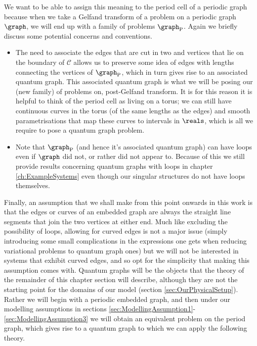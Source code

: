 We want to be able to assign this meaning to the period cell of a periodic graph because when we take a Gelfand transform of a problem on a periodic graph $\graph$, we will end up with a family of problems $\graph_{\mathrm{P}}$.
Again we briefly discuss some potential concerns and conventions.
\begin{itemize}
	\item The need to associate the edges that are cut in two and vertices that lie on the boundary of $\mathcal{C}$ allows us to preserve some idea of edges with lengths connecting the vertices of $\graph_{\mathrm{P}}$, which in turn gives rise to an associated quantum graph.
	This associated quantum graph is what we will be posing our (new family) of problems on, post-Gelfand transform.
	It is for this reason it is helpful to think of the period cell as living on a torus; we can still have continuous curves in the torus (of the same lengths as the edges) and smooth parametrisations that map these curves to intervals in $\reals$, which is all we require to pose a quantum graph problem.
	\item Note that $\graph_{\mathrm{P}}$ (and hence it's associated quantum graph) can have loops even if $\graph$ did not, or rather did not appear to.
	Because of this we still provide results concerning quantum graphs with loops in chapter \ref{ch:ExampleSystems} even though our singular structures do not have loops themselves.
\end{itemize}
Finally, an assumption that we shall make from this point onwards in this work is that the edges or curves of an embedded graph are always the straight line segments that join the two vertices at either end.
Much like excluding the possibility of loops, allowing for curved edges is not a major issue (simply introducing some small complications in the expressions one gets when reducing variational problems to quantum graph ones) but we will not be interested in systems that exhibit curved edges, and so opt for the simplicity that making this assumption comes with.
Quantum graphs will be the objects that the theory of the remainder of this chapter section will describe, although they are not the starting point for the domains of our model (section \ref{sec:OurPhysicalSetup}). 
Rather we will begin with a periodic embedded graph, and then under our modelling assumptions in sections \ref{sec:ModellingAssumption1}-\ref{sec:ModellingAssumption3} we will obtain an equivalent problem on the period graph, which gives rise to a quantum graph to which we can apply the following theory.

